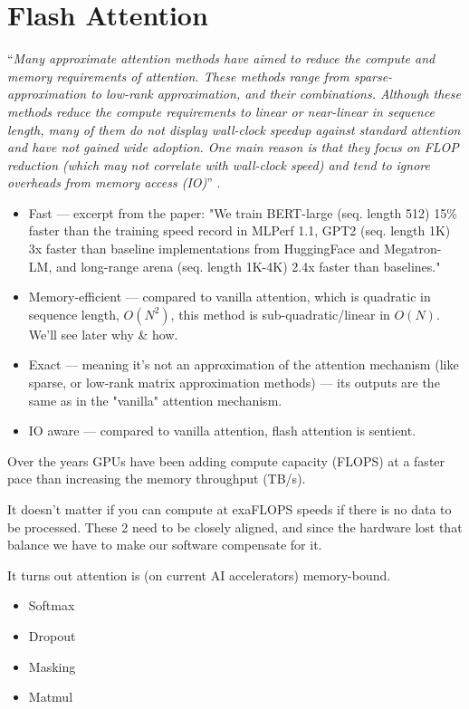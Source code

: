 \chapter{Flash Attention}

``\textit{Many approximate attention methods have aimed to reduce the compute and memory requirements of attention. These methods range from sparse-approximation to low-rank approximation, and their combinations. Although these methods reduce the compute requirements to linear or near-linear in sequence length, many of them do not display wall-clock speedup against standard attention and have not gained wide adoption. One main reason is that they focus on FLOP reduction (which may not correlate with wall-clock speed) and tend to ignore overheads from memory access (IO)}'' \cite{dao2022flashattention}.

\begin{itemize}
	\item    Fast — excerpt from the paper: "We train BERT-large (seq. length 512) 15\% faster than the training speed record in MLPerf 1.1, GPT2 (seq. length 1K) 3x faster than baseline implementations from HuggingFace and Megatron-LM, and long-range arena (seq. length 1K-4K) 2.4x faster than baselines."
	\item Memory-efficient — compared to vanilla attention, which is quadratic in sequence length, $O(N^2)$, this method is sub-quadratic/linear in $O(N)$. We'll see later why & how.
	\item Exact — meaning it's not an approximation of the attention mechanism (like \eg sparse, or low-rank matrix approximation methods) — its outputs are the same as in the "vanilla" attention mechanism.
	\item IO aware — compared to vanilla attention, flash attention is sentient.
\end{itemize}

Over the years GPUs have been adding compute capacity (FLOPS) at a faster pace than increasing the memory throughput (TB/s).

It doesn't matter if you can compute at exaFLOPS speeds if there is no data to be processed. These 2 need to be closely aligned, and since the hardware lost that balance we have to make our software compensate for it.

It turns out attention is (on current AI accelerators) memory-bound.
\begin{itemize}
	\item Softmax
	\item Dropout
	\item Masking
	\item Matmul
\end{itemize}




